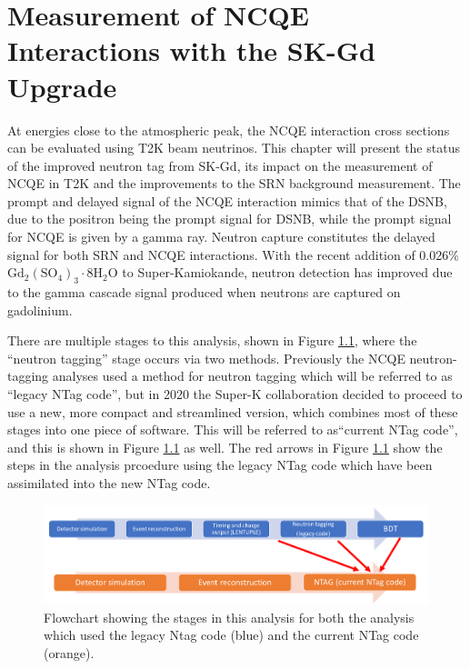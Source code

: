 \chapter{Measurement of NCQE
Interactions with the SK-Gd Upgrade}
\label{chp:ncqegd}


At energies close to the atmospheric peak, the NCQE interaction cross sections can be evaluated using T2K beam neutrinos. This chapter will present the status of the improved neutron tag from SK-Gd, its impact on the measurement of NCQE in T2K and the improvements to the SRN background measurement. The prompt and delayed signal of the NCQE interaction mimics that of the DSNB, due to the positron being the prompt signal for DSNB, while the prompt signal for NCQE is given by a gamma ray. Neutron capture constitutes the delayed signal for both SRN and NCQE interactions. With the recent addition of 0.026\% $\mathrm{Gd}_{2}\left(\mathrm{SO}_{4}\right)_{3} \cdot 8 \mathrm{H}_{2} \mathrm{O}$ to Super-Kamiokande, neutron detection has improved due to the  gamma cascade signal produced when neutrons are captured on gadolinium. 

There are multiple stages to this analysis, shown in Figure \ref{fig:analysis_flowchart}, where the ``neutron tagging'' stage occurs via two methods. Previously the NCQE neutron-tagging analyses used a method for neutron tagging which will be referred to as ``legacy NTag code'', but in 2020 the Super-K collaboration decided to proceed to use a new, more compact and streamlined version, which combines most of these stages into one piece of software. This will be referred to as``current NTag code'', and this is shown in Figure \ref{fig:analysis_flowchart} as well. The red arrows in Figure \ref{fig:analysis_flowchart} show the steps in the analysis prcoedure using the legacy NTag code which have been assimilated into the new NTag code.

\begin{figure}
    \includegraphics[width=\textwidth]{Figures/analysis_flowchart.png}
    \caption{Flowchart showing the stages in this analysis for both the analysis which used the legacy Ntag code (blue) and the current NTag code (orange).}
\label{fig:analysis_flowchart}
\end{figure}

